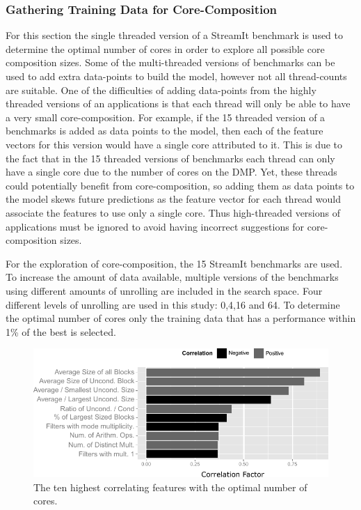 \subsubsection{Gathering Training Data for Core-Composition}
For this section the single threaded version of a StreamIt benchmark is used to determine the optimal number of cores in order to explore all possible core composition sizes.
Some of the multi-threaded versions of benchmarks can be used to add extra data-points to build the model, however not all thread-counts are suitable.
One of the difficulties of adding data-points from the highly threaded versions of an applications is that each thread will only be able to have a very small core-composition.
For example, if the 15 threaded version of a benchmarks is added as data points to the model, then each of the feature vectors for this version would have a single core attributed to it.
This is due to the fact that in the 15 threaded versions of benchmarks each thread can only have a single core due to the number of cores on the DMP.
Yet, these threads could potentially benefit from core-composition, so adding them as data points to the model skews future predictions as the feature vector for each thread would associate the features to use only a single core.
Thus high-threaded versions of applications must be ignored to avoid having incorrect suggestions for core-composition sizes.

For the exploration of core-composition, the 15 StreamIt benchmarks are used. %
To increase the amount of data available, multiple versions of the benchmarks using different amounts of unrolling are included in the search space.
Four different levels of unrolling are used in this study: 0,4,16 and 64.
To determine the optimal number of cores only the training data that has a performance within 1\% of the best is selected.

\begin{figure}[t]
\centering
  \includegraphics[width=1\textwidth]{streamit-paper/graphics/corrGraph_remix2.pdf}
  \caption{The ten highest correlating features with the optimal number of cores.}\label{fig:corrCore}
\end{figure}


